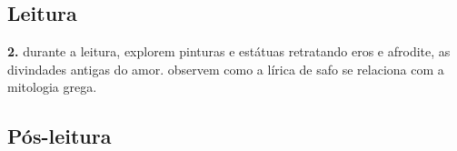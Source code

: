 \documentclass[12pt]{extarticle}
\begin{document}
\subsection{Leitura}









\textbf{2.} durante a leitura, explorem pinturas e estátuas retratando
eros e afrodite, as divindades antigas do amor. observem como a lírica
de safo se relaciona com a mitologia grega.



\subsection{Pós-leitura}

\end{document}
